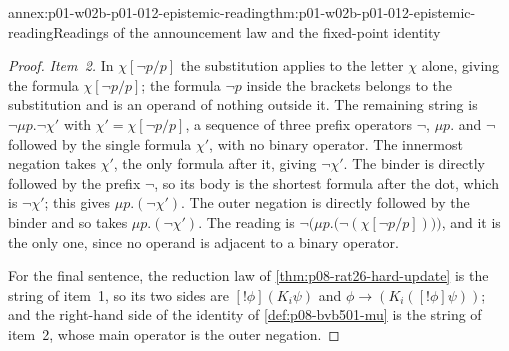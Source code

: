 \begin{annexitem}{annex:p01-w02b-p01-012-epistemic-reading}{thm:p01-w02b-p01-012-epistemic-reading}{Readings of the announcement law and the fixed-point identity}
\begin{proof}
\emph{Item~2.}  In \(\chi[\neg p/p]\) the substitution applies to the
letter \(\chi\) alone, giving the formula \(\chi[\neg p/p]\); the formula
\(\neg p\) inside the brackets belongs to the substitution and is an
operand of nothing outside it.  The remaining string is
\(\neg\mu p.\neg\chi'\) with \(\chi'=\chi[\neg p/p]\), a sequence of three
prefix operators \(\neg\), \(\mu p.\) and \(\neg\) followed by the single
formula \(\chi'\), with no binary operator.  The innermost negation takes
\(\chi'\), the only formula after it, giving \(\neg\chi'\).  The binder is
directly followed by the prefix \(\neg\), so its body is the shortest
formula after the dot, which is \(\neg\chi'\); this gives
\(\mu p.(\neg\chi')\).  The outer negation is directly followed by the
binder and so takes \(\mu p.(\neg\chi')\).  The reading is
\(\neg\bigl(\mu p.\bigl(\neg(\chi[\neg p/p])\bigr)\bigr)\), and it is the
only one, since no operand is adjacent to a binary operator.

For the final sentence, the reduction law of
\cref{thm:p08-rat26-hard-update} is the string of item~1, so its two sides
are \([!\phi](K_i\psi)\) and \(\phi\to(K_i([!\phi]\psi))\); and the
right-hand side of the identity of \cref{def:p08-bvb501-mu} is the string
of item~2, whose main operator is the outer negation.
\end{proof}
\end{annexitem}

